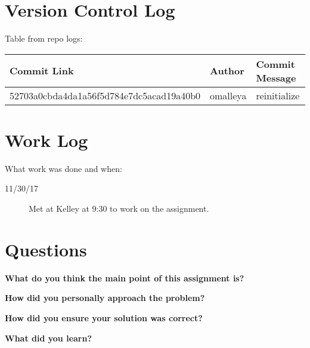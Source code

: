 \documentclass[10pt,letterpaper,draftclsnofoot,onecolumn]{IEEEtran}
\begin{document}
\section{Version Control Log}
\noindent Table from repo logs:

\begin{center}
    \begin{tabular}{ | p{8cm} | p{3cm} | p{6cm} |}
    \hline
    Commit Link & Author & Commit Message \\ \hline
    52703a0cbda4da1a56f5d784e7dc5acad19a40b0 & omalleya & reinitialize \\ \hline
 
    \end{tabular}
\end{center}

\section{Work Log}
\noindent What work was done and when:
\begin{description}
\item [11/30/17] Met at Kelley at 9:30 to work on the assignment.

\end{description}

\section{Questions}

\noindent\textbf{What do you think the main point of this assignment is?}

\indent{
}

\noindent\textbf{How did you personally approach the problem?}

\indent{

}

\noindent\textbf{How did you ensure your solution was correct?}

\indent{

}

\noindent\textbf{What did you learn?}

\indent{

}
\end{document}
